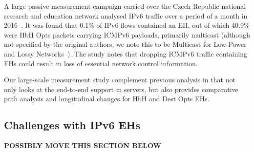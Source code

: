 \documentclass[conference]{IEEEtran}
\begin{document}

A large passive measurement campaign carried over the Czech Republic national
research and education network analysed IPv6 traffic over a period of a month in
2016~\cite{passive-threats}. It was found that 0.1\% of IPv6 flows
contained an EH, out of which 40.9\% were HbH Opts packets carrying ICMPv6
payloads, primarily multicast (although not specified by the original authors,
we note this to be Multicast for Low-Power and Lossy Networks~\cite{RFC7731}).
The study notes that dropping ICMPv6 traffic containing EHs could result in
loss of essential network control information. 


Our large-scale measurement study complement previous analysis in that not only
looks at the end-to-end support in servers, but also provides comparative path
analysis and longitudinal changes for HbH and Dest Opts EHs.

\subsection{Challenges with IPv6 EHs}

\textbf{POSSIBLY MOVE THIS SECTION BELOW}
\end{document}
